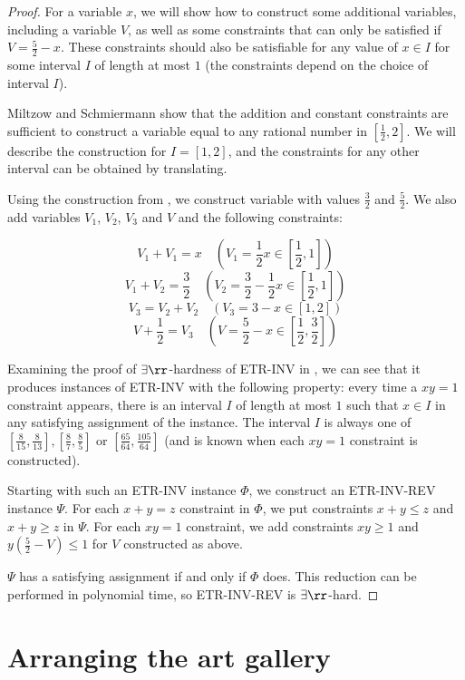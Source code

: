 \begin{proof}
For a variable $x$, we will show how to construct some additional variables, including a variable $V$, as well as some constraints that can only be satisfied if $V=\frac52-x$. These constraints should also be satisfiable for any value of $x\in I$ for some interval $I$ of length at most $1$ (the constraints depend on the choice of interval $I$).

Miltzow and Schmiermann \cite{ConvexConcave} show that the addition and constant constraints are sufficient to construct a variable equal to any rational number in $[\frac12, 2]$. We will describe the construction for $I=[1, 2]$, and the constraints for any other interval can be obtained by translating.

Using the construction from \cite{ConvexConcave}, we construct variable with values $\frac32$ and $\frac52$. We also add variables $V_1$, $V_2$, $V_3$ and $V$ and the following constraints:

\[V_1+V_1=x\quad\left(V_1=\frac12x\in[\frac12, 1]\right)\]
\[V_1+V_2=\frac32\quad\left(V_2=\frac32-\frac12x\in[\frac12, 1]\right)\]
\[V_3=V_2+V_2\quad\left(V_3=3-x\in[1, 2]\right)\]
\[V+\frac12=V_3\quad\left(V=\frac52-x\in[\frac12, \frac32]\right)\]

Examining the proof of $\exists\rr$-hardness of ETR-INV in \cite{ExistsRHardness}, we can see that it produces instances of ETR-INV with the following property: every time a $xy=1$ constraint appears, there is an interval $I$ of length at most $1$ such that $x\in I$ in any satisfying assignment of the instance. The interval $I$ is always one of $[\frac{8}{15}, \frac{8}{13}], [\frac{8}{7}, \frac{8}{5}]$ or $[\frac{65}{64}, \frac{105}{64}]$ (and is known when each $xy=1$ constraint is constructed). 

Starting with such an ETR-INV instance $\Phi$, we construct an ETR-INV-REV instance $\Psi$. For each $x+y=z$ constraint in $\Phi$, we put constraints $x+y\le z$ and $x+y\ge z$ in $\Psi$. For each $xy=1$ constraint, we add constraints $xy\ge 1$ and $y\left(\frac52-V\right)\le 1$ for $V$ constructed as above.

$\Psi$ has a satisfying assignment if and only if $\Phi$ does. This reduction can be performed in polynomial time, so ETR-INV-REV is $\exists\rr$-hard.
\end{proof}

\section{Arranging the art gallery}\label{sec:Arrangement}

